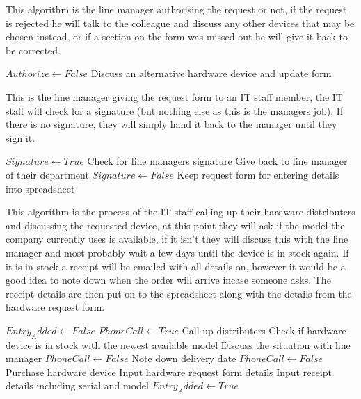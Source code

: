This algorithm is the line manager authorising the request or not, if the request is rejected he will talk to the colleague and discuss any other devices that may be chosen instead, or if a section on the form was missed out he will give it back to be corrected.

\begin{algorithm}[H]
\begin{algorithmic}
\State$Authorize \leftarrow False$
		\State Discuss an alternative hardware device and update form
	\Else
	\EndIf
\EndWhile
\end{algorithmic}
\end{algorithm}

This is the line manager giving the request form to an IT staff member, the IT staff will check for a signature (but nothing else as this is the managers job). If there is no signature, they will simply hand it back to the manager until they sign it.

\begin{algorithm}[H]
\begin{algorithmic}
\State $Signature  \leftarrow True$
	\State Check for line managers signature
		\State Give back to line manager of their department
		\State $Signature  \leftarrow False$
	\Else
		\State Keep request form for entering details into spreadsheet
\EndIf
\EndWhile
\end{algorithmic}
\end{algorithm}

This algorithm is the process of the IT staff calling up their hardware distributers and discussing the requested device, at this point they will ask if the model the company currently uses is available, if it isn't they will discuss this with the line manager and most probably wait a few days until the device is in stock again. If it is in stock a receipt will be emailed with all details on, however it would be a good idea to note down when the order will arrive incase someone asks. The receipt details are then put on to the spreadsheet along with the details from the hardware request form.

\begin{algorithm}[H]
\begin{algorithmic}
\State $Entry_Added \leftarrow False$
\State $PhoneCall \leftarrow True$
		\State Call up distributers
		\State Check if hardware device is in stock with the newest available model
			\State Discuss the situation with line manager
			\State  $PhoneCall \leftarrow False$
		\Else
			\State Note down delivery date
			\State  $PhoneCall \leftarrow False$
		\EndIf
	\EndWhile
	\State Purchase hardware device
	\State Input hardware request form details
	\State Input receipt details including serial and model
	\State $Entry_Added \leftarrow True$
\EndWhile
\end{algorithmic}
\end{algorithm}

